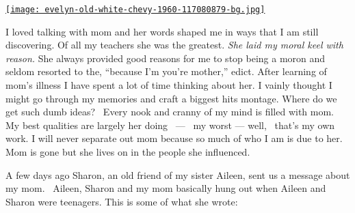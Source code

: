 \begin{floatingfigure}[r]{0.25\textwidth}
\centering
\href{http://conceptcontrol.smugmug.com/People/The-Way-We-Were/7056082\_X8X9pK\#!i=473519740\&k=Z64DmrR\&lb=1\&s=A}{\texttt{[image: evelyn-old-white-chevy-1960-117080879-bg.jpg]}}
\label{fig:4027X1}
\end{floatingfigure} I loved talking with mom and her words shaped me in ways that I am still
discovering. Of all my teachers she was the greatest. \emph{She laid my
moral keel with reason.} She always provided good reasons for me to stop
being a moron and seldom resorted to the, ``because I'm you're mother,''
edict. After learning of mom's illness I have spent a lot of time
thinking about her. I vainly thought I might go through my memories and
craft a biggest hits montage. Where do we get such dumb ideas? ~Every
nook and cranny of my mind is filled with mom. My best qualities are
largely her doing ~--- ~my worst --- well, ~that's my own work. I will
never separate out mom because so much of who I am is due to her. Mom
is gone but she lives on in the people she influenced.

A few days ago Sharon, an old friend of my sister Aileen, sent us a
message about my mom. ~Aileen, Sharon and my mom basically hung out when
Aileen and Sharon were teenagers. This is some of what she wrote:

